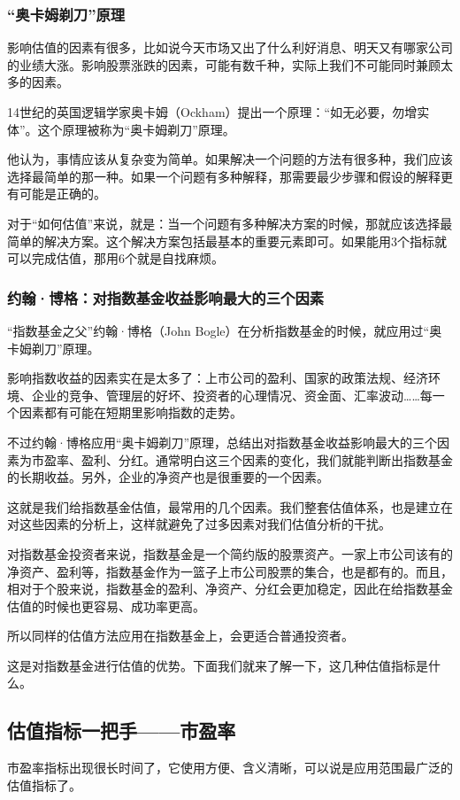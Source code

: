 \subsubsection{“奥卡姆剃刀”原理}

影响估值的因素有很多，比如说今天市场又出了什么利好消息、明天又有哪家公司的业绩大涨。影响股票涨跌的因素，可能有数千种，实际上我们不可能同时兼顾太多的因素。

14世纪的英国逻辑学家奥卡姆（Ockham）提出一个原理：“如无必要，勿增实体”。这个原理被称为“奥卡姆剃刀”原理。

他认为，事情应该从复杂变为简单。如果解决一个问题的方法有很多种，我们应该选择最简单的那一种。如果一个问题有多种解释，那需要最少步骤和假设的解释更有可能是正确的。

对于“如何估值”来说，就是：当一个问题有多种解决方案的时候，那就应该选择最简单的解决方案。这个解决方案包括最基本的重要元素即可。如果能用3个指标就可以完成估值，那用6个就是自找麻烦。

\subsubsection{约翰·博格：对指数基金收益影响最大的三个因素}

“指数基金之父”约翰·博格（John Bogle）在分析指数基金的时候，就应用过“奥卡姆剃刀”原理。

影响指数收益的因素实在是太多了：上市公司的盈利、国家的政策法规、经济环境、企业的竞争、管理层的好坏、投资者的心理情况、资金面、汇率波动……每一个因素都有可能在短期里影响指数的走势。

不过约翰·博格应用“奥卡姆剃刀”原理，总结出对指数基金收益影响最大的三个因素为市盈率、盈利、分红。通常明白这三个因素的变化，我们就能判断出指数基金的长期收益。另外，企业的净资产也是很重要的一个因素。

这就是我们给指数基金估值，最常用的几个因素。我们整套估值体系，也是建立在对这些因素的分析上，这样就避免了过多因素对我们估值分析的干扰。

对指数基金投资者来说，指数基金是一个简约版的股票资产。一家上市公司该有的净资产、盈利等，指数基金作为一篮子上市公司股票的集合，也是都有的。而且，相对于个股来说，指数基金的盈利、净资产、分红会更加稳定，因此在给指数基金估值的时候也更容易、成功率更高。

所以同样的估值方法应用在指数基金上，会更适合普通投资者。

这是对指数基金进行估值的优势。下面我们就来了解一下，这几种估值指标是什么。

\subsection{估值指标一把手——市盈率}
市盈率指标出现很长时间了，它使用方便、含义清晰，可以说是应用范围最广泛的估值指标了。

